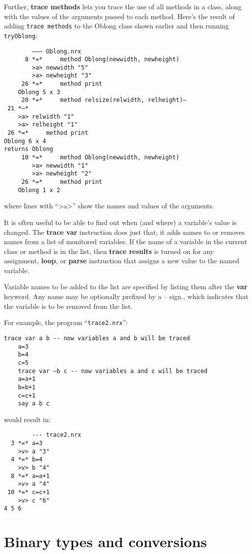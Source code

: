 Further, \textbf{trace methods} lets you trace the use of all methods in a
class, along with the values of the arguments passed to each
method. Here’s the result of adding \texttt{trace methods} to the Oblong class
shown earlier and then running \texttt{tryOblong}:
\begin{verbatim}
        ––– Oblong.nrx
      8 *=*     method Oblong(newwidth, newheight)
        >a> newwidth "5"
        >a> newheight "3"
     26 *=*     method print
    Oblong 5 x 3
     20 *=*     method relsize(relwidth, relheight)–
 21 *–*
    >a> relwidth "1"
    >a> relheight "1"
 26 *=*     method print
Oblong 6 x 4
returns Oblong
     10 *=*     method Oblong(newwidth, newheight)
        >a> newwidth "1"
        >a> newheight "2"
     26 *=*     method print
    Oblong 1 x 2
\end{verbatim}
where lines with “>a>” show the names and values of the arguments.

It is often useful to be able to find out when (and where) a variable’s value is changed. The \textbf{trace var} instruction does just that; it adds names to or removes names from a list of monitored variables. If the name of a variable in the current class or method is in the list, then \textbf{trace results} is turned on for any assignment, \textbf{loop}, or \textbf{parse} instruction that assigns a new value to the named variable.

Variable names to be added to the list are specified by listing them after the \textbf{var} keyword. Any name may be optionally prefixed by a – sign., which indicates that the variable is to be removed from the list.

For example, the program “\texttt{trace2.nrx}”:
\begin{lstlisting}[label=trace2,caption=trace2.nrx]
    trace var a b -- now variables a and b will be traced
    a=3
    b=4
    c=5
    trace var –b c -- now variables a and c will be traced
    a=a+1
    b=b+1
    c=c+1
    say a b c
\end{lstlisting}
would result in:
\begin{verbatim}
        --- trace2.nrx
  3 *=* a=3
    >v> a "3"
  4 *=* b=4
    >v> b "4"
  8 *=* a=a+1
    >v> a "4"
 10 *=* c=c+1
    >v> c "6"
4 5 6
\end{verbatim}

\section{Binary types and conversions}\label{binarith}

